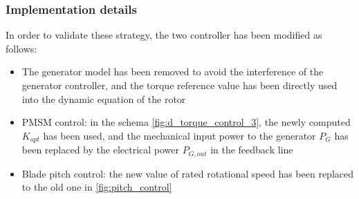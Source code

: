 \subsubsection{Implementation details}
In order to validate these strategy, the two controller has been modified as follows:
\begin{itemize}
  \item The generator model has been removed to avoid the interference of the generator controller, and the torque reference value has been directly used into the dynamic equation of the rotor
  \item PMSM control: in the schema \autoref{fig:d_torque_control_3}, the newly computed  $K_{opt}$ has been used, and the mechanical input power to the generator $P_G$ has been replaced by the electrical power $P_{G, out}$ in the feedback line
  \item Blade pitch control: the new value of rated rotational speed has been replaced to the old one in \autoref{fig:pitch_control}
\end{itemize}
